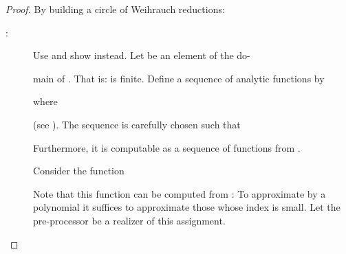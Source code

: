 \documentclass{eptcs-modified}
\begin{document}
			\begin{proof}
				By building a circle of Weihrauch reductions:
				\begin{description}
					\item[:]
						Use  and show  instead.
						Let  be an element of the do- \quad

						\noindent\begin{minipage}{.6\textwidth}
main of .
							That is:  is finite.
							Define a sequence of analytic functions  by
							
							where
							
							(see ). The sequence is carefully chosen such that
						\end{minipage}\hspace{.25cm}
						\begin{minipage}{.3\textwidth}
							\vspace{-.1cm}
							\label{fig:the functions fn}
						\end{minipage}
						
						Furthermore, it is computable as a sequence of functions from .

						Consider the function
						
						Note that this function can be computed from : To approximate  by a polynomial it suffices to approximate those  whose index is small.
						Let the pre-processor be a realizer of this assignment.


\end{description}
\end{proof}
\end{document}

